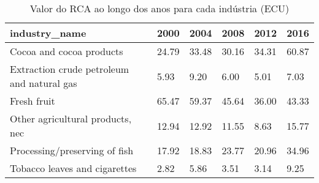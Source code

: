 \begin{table}
\centering
\caption{Valor do RCA ao longo dos anos para cada indústria (ECU)}
\begin{tabular}{p{6cm}p{1.5cm}p{1.5cm}p{1.5cm}p{1.5cm}p{1.5cm}}
\toprule
                             industry\_name &  2000 &  2004 &  2008 &  2012 &  2016 \\
\midrule
                  Cocoa and cocoa products & 24.79 & 33.48 & 30.16 & 34.31 & 60.87 \\
Extraction crude petroleum and natural gas &  5.93 &  9.20 &  6.00 &  5.01 &  7.03 \\
                               Fresh fruit & 65.47 & 59.37 & 45.64 & 36.00 & 43.33 \\
          Other agricultural products, nec & 12.94 & 12.92 & 11.55 &  8.63 & 15.77 \\
             Processing/preserving of fish & 17.92 & 18.83 & 23.77 & 20.96 & 34.96 \\
             Tobacco leaves and cigarettes &  2.82 &  5.86 &  3.51 &  3.14 &  9.25 \\
\bottomrule
\end{tabular}
\end{table}
